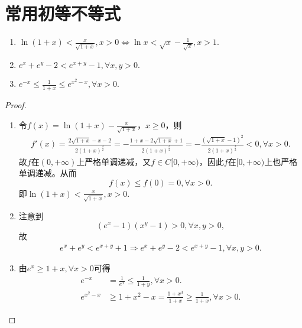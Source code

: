 \documentclass[../../main.tex]{subfiles}
\begin{document}
\section{常用初等不等式}

\begin{proposition}[常用不等式]\label{proposition:常用不等式}
\begin{enumerate}[(1)]
\item\label{proposition:常用不等式1} $\ln \left( 1+x \right) <\frac{x}{\sqrt{1+x}},x>0\iff \ln x<\sqrt{x}-\frac{1}{\sqrt{x}},x>1.$

\item \label{proposition:常用不等式3} $e^x+e^y-2<e^{x+y}-1,\forall x,y>0.$

\item \label{proposition:常用不等式4} $e^{-x}\leqslant \frac{1}{1+x}\leqslant e^{x^2-x},\forall x>0.$
\end{enumerate}
\end{proposition}
\begin{proof}
\begin{enumerate}[(1)]
\item 令\(f(x)=\ln(1 + x)-\frac{x}{\sqrt{1 + x}}\)，\(x\geqslant 0\)，则
\begin{align*}
f'\left( x \right) =\frac{2\sqrt{1+x}-x-2}{2\left( 1+x \right) ^{\frac{3}{2}}}=-\frac{1+x-2\sqrt{1+x}+1}{2\left( 1+x \right) ^{\frac{3}{2}}}=-\frac{\left( \sqrt{1+x}-1 \right) ^2}{2\left( 1+x \right) ^{\frac{3}{2}}}<0,\forall x>0.
\end{align*}
故\(f\)在\((0,+\infty)\)上严格单调递减，又\(f\in C[0,+\infty)\)，因此\(f\)在\([0,+\infty)\)上也严格单调递减。从而
\[
f(x)\leqslant f(0)=0,\forall x>0.
\]
即\(\ln(1 + x)<\frac{x}{\sqrt{1 + x}},x>0\).

\item 注意到
\[
(e^x-1)(x^y-1)>0,\forall x,y>0,
\]
故
\begin{align*}
e^x+e^y<e^{x+y}+1\Longrightarrow e^x+e^y-2<e^{x+y}-1,\forall x,y>0.
\end{align*}

\item 由$e^x\geqslant 1+x,\forall x>0$可得
\begin{align*}
e^{-x}&=\frac{1}{e^x}\leqslant \frac{1}{1+y},\forall x>0.
\\
e^{x^2-x}&\geqslant 1+x^2-x=\frac{1+x^3}{1+x}\geqslant \frac{1}{1+x},\forall x>0.
\end{align*}
\end{enumerate}

\end{proof}
\end{document}
